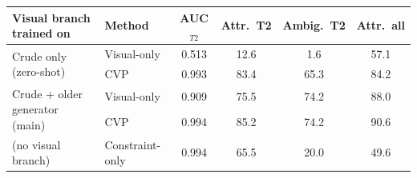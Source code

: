 \begin{tabular}{llcccc}
\toprule
Visual branch trained on & Method & AUC$_{T2}$ & Attr.\ T2 & Ambig.\ T2 & Attr.\ all\\
\midrule
\multirow{2}{*}{Crude only (zero-shot)} & Visual-only & 0.513 & 12.6 & 1.6 & 57.1\\
 & CVP & 0.993 & 83.4 & 65.3 & 84.2\\
\midrule
\multirow{2}{*}{Crude + older generator (main)} & Visual-only & 0.909 & 75.5 & 74.2 & 88.0\\
 & CVP & 0.994 & 85.2 & 74.2 & 90.6\\
\midrule
(no visual branch) & Constraint-only & 0.994 & 65.5 & 20.0 & 49.6\\
\bottomrule
\end{tabular}
